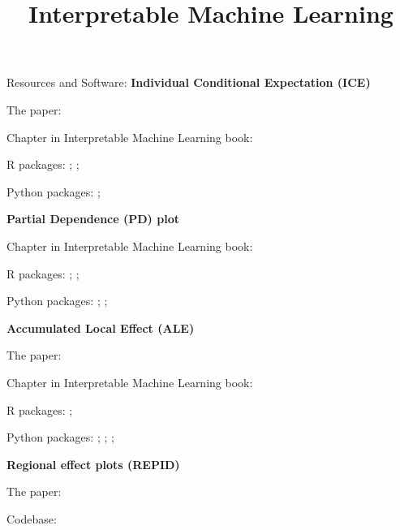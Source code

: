 \documentclass[10pt,compress,t,notes=noshow,xcolor=table]{beamer}
\title{Interpretable Machine Learning}
\begin{document}


\begin{framev}[align=top]{Resources and Software:}
\textbf{Individual Conditional Expectation (ICE)}
\begin{itemizeM}
\item The paper: 
\item Chapter in Interpretable Machine Learning book: 
\item R packages: ; ; 
\item Python packages: ; 
\end{itemizeM}
\spacer[0.25]
\textbf{Partial Dependence (PD) plot}
\begin{itemizeM}
\item Chapter in Interpretable Machine Learning book: 
\item R packages: ; ; 
\item Python packages: ; ; 
\end{itemizeM}
\textbf{Accumulated Local Effect (ALE)}
\begin{itemizeM}
\item The paper: 
\item Chapter in Interpretable Machine Learning book: 
\item R packages: ; 
\item Python packages: ; ; ; 
\end{itemizeM}
\textbf{Regional effect plots (REPID)}
\begin{itemizeM}
\item The paper: 
\item Codebase: 
\end{itemizeM}
\end{framev}


\endlecture
\end{document}
